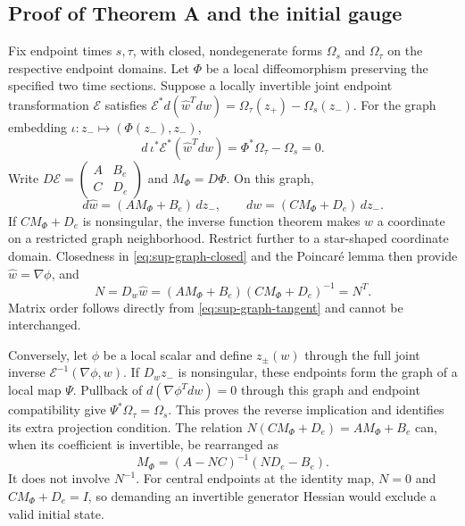 \subsection{Proof of Theorem A and the initial gauge}
Fix endpoint times $s,\tau$, with closed, nondegenerate forms $\Omega_s$ and $\Omega_\tau$ on the respective endpoint domains. Let $\Phi$ be a local diffeomorphism preserving the specified two time sections. Suppose a locally invertible joint endpoint transformation $\mathcal E$ satisfies
$\mathcal E^*d(\widehat w^Tdw)=\Omega_\tau(z_+)-\Omega_s(z_-)$. For the graph embedding $\iota:z_-\mapsto(\Phi(z_-),z_-)$,
\begin{equation}
 d\,\iota^*\mathcal E^*(\widehat w^Tdw)=\Phi^*\Omega_\tau-\Omega_s=0.
 \label{eq:sup-graph-closed}
\end{equation}
Write $D\mathcal E=\left(\begin{smallmatrix}A&B_e\\C&D_e\end{smallmatrix}\right)$ and $M_\Phi=D\Phi$. On this graph,
\begin{equation}
 d\widehat w=(AM_\Phi+B_e)\,dz_-,\qquad
 dw=(CM_\Phi+D_e)\,dz_-.
 \label{eq:sup-graph-tangent}
\end{equation}
If $CM_\Phi+D_e$ is nonsingular, the inverse function theorem makes $w$ a coordinate on a restricted graph neighborhood. Restrict further to a star-shaped coordinate domain. Closedness in \eqref{eq:sup-graph-closed} and the Poincar\'e lemma then provide $\widehat w=\nabla\phi$, and
\begin{equation}
 N=D_w\widehat w=(AM_\Phi+B_e)(CM_\Phi+D_e)^{-1}=N^T.
 \label{eq:sup-hessian}
\end{equation}
Matrix order follows directly from \eqref{eq:sup-graph-tangent} and cannot be interchanged.

Conversely, let $\phi$ be a local scalar and define $z_\pm(w)$ through the full joint inverse $\mathcal E^{-1}(\nabla\phi,w)$. If $D_wz_-$ is nonsingular, these endpoints form the graph of a local map $\Psi$. Pullback of $d(\nabla\phi^Tdw)=0$ through this graph and endpoint compatibility give $\Psi^*\Omega_\tau=\Omega_s$. This proves the reverse implication and identifies its extra projection condition. The relation $N(CM_\Phi+D_e)=AM_\Phi+B_e$ can, when its coefficient is invertible, be rearranged as
\begin{equation}
 M_\Phi=(A-NC)^{-1}(ND_e-B_e).
 \label{eq:sup-reconstruct}
\end{equation}
It does not involve $N^{-1}$. For central endpoints at the identity map, $N=0$ and $CM_\Phi+D_e=I$, so demanding an invertible generator Hessian would exclude a valid initial state.

